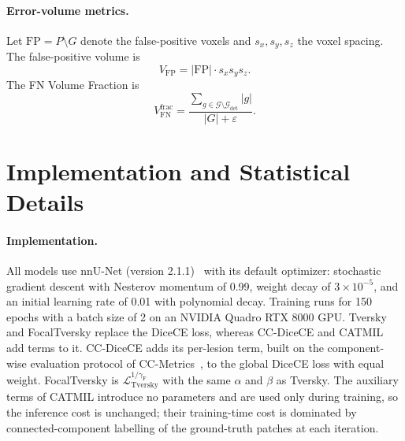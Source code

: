 \paragraph{Error-volume metrics.}
Let $\mathrm{FP} = P \setminus G$ denote the false-positive voxels and
$s_x, s_y, s_z$ the voxel spacing. The false-positive volume is
\begin{equation}
V_{\mathrm{FP}} = |\mathrm{FP}| \cdot s_x s_y s_z.
\end{equation}
The FN Volume Fraction is
\begin{equation}
V_{\mathrm{FN}}^{\mathrm{frac}}
= \frac{\sum_{g \in \mathcal{G} \setminus \mathcal{G}_{\mathrm{det}}} |g|}
{|G| + \varepsilon}.
\end{equation}

\section{Implementation and Statistical Details}
\label{appendix:impl-stats}

\paragraph{Implementation.}
\label{appendix:implementation}
All models use nnU-Net (version 2.1.1)~\cite{isensee_nnu-net_2021} with
its default optimizer: stochastic gradient descent with Nesterov momentum
of 0.99, weight decay of $3\times10^{-5}$, and an initial learning rate of
0.01 with polynomial decay. Training runs for 150 epochs with a batch size
of 2 on an NVIDIA Quadro RTX 8000 GPU. Tversky and FocalTversky replace the
DiceCE loss, whereas CC-DiceCE and CATMIL add terms to it. CC-DiceCE adds
its per-lesion term, built on the component-wise evaluation protocol of
CC-Metrics~\cite{jaus_every_2025}, to the global DiceCE loss with equal
weight. FocalTversky is $\mathcal{L}_{\mathrm{Tversky}}^{1/\gamma_{\mathrm{F}}}$
with the same $\alpha$ and $\beta$ as Tversky. The auxiliary terms of CATMIL
introduce no parameters and are used only during training, so the inference
cost is unchanged; their training-time cost is dominated by connected-component
labelling of the ground-truth patches at each iteration.

